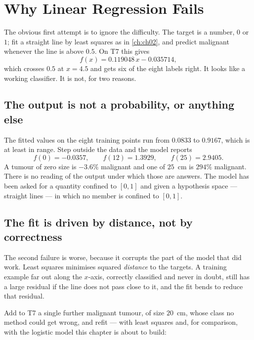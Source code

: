 \section{Why Linear Regression Fails}
\label{sec:linreg-fails}

The obvious first attempt is to ignore the difficulty. The target is a number,
$0$ or $1$; fit a straight line by least squares as in \cref{ch:ch02}, and
predict malignant whenever the line is above $0.5$. On T7 this gives
\[
  f(x) = 0.119048\,x - 0.035714 ,
\]
which crosses $0.5$ at $x = 4.5$ and gets six of the eight labels right. It looks
like a working classifier. It is not, for two reasons.

\subsection{The output is not a probability, or anything else}

The fitted values on the eight training points run from $0.0833$ to $0.9167$,
which is at least in range. Step outside the data and the model reports
\[
  f(0) = -0.0357, \qquad f(12) = 1.3929, \qquad f(25) = 2.9405 .
\]
A tumour of zero size is $-3.6\%$ malignant and one of $25$~cm is $294\%$
malignant. There is no reading of the output under which those are answers. The
model has been asked for a quantity confined to $[0,1]$ and given a hypothesis
space --- straight lines --- in which no member is confined to $[0,1]$.

\subsection{The fit is driven by distance, not by correctness}

The second failure is worse, because it corrupts the part of the model that did
work. Least squares minimises squared \emph{distance} to the targets. A training
example far out along the $x$-axis, correctly classified and never in doubt,
still has a large residual if the line does not pass close to it, and the fit
bends to reduce that residual.

Add to T7 a single further malignant tumour, of size $20$~cm, whose class no
method could get wrong, and refit --- with least squares and, for comparison,
with the logistic model this chapter is about to build:

